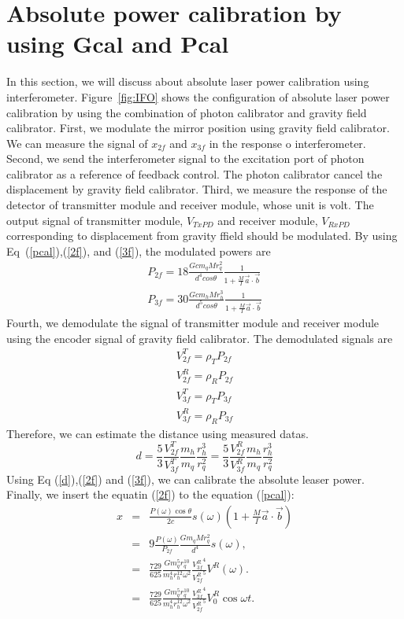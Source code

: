 \documentclass[A4]{spie}  %
\begin{document}
\section{Absolute power calibration by using Gcal and Pcal}
In this section, we will discuss about absolute laser power calibration using interferometer. 
Figure~\ref{fig:IFO} shows the configuration of absolute laser power calibration by using the combination of photon calibrator and gravity field calibrator.
First, we modulate the mirror position using gravity field calibrator. We can measure the signal of $x_{2f}$ and $x_{3f}$ in the response o interferometer. Second, we send the interferometer signal to the excitation port of photon calibrator as a reference of feedback control. The photon calibrator cancel the displacement by gravity field calibrator. Third, we measure the response of the detector of transmitter module and receiver module, whose unit is volt. The output signal of transmitter module, $V_{TxPD}$ and receiver module, $V_{RxPD}$ corresponding to displacement from gravity ffield should be modulated. By using Eq~(\ref{pcal}),(\ref{2f}), and (\ref{3f}), the modulated powers are
\begin{eqnarray}
 P_{2f}=18 \frac{Gcm_{q}Mr_{q}^2}{d^4cos\theta}\frac{1}{1+\frac{M}{I}\vec{a}\cdot \vec{b}} \label{2f} \\
 P_{3f}= 30\frac{Gcm_{h}Mr_{h}^3}{d^5cos\theta}\frac{1}{1+\frac{M}{I}\vec{a}\cdot \vec{b}} \label{3f}
\end{eqnarray}
Fourth, we demodulate the signal of transmitter module and receiver module using the encoder signal of gravity field calibrator.
The demodulated signals are 
\begin{eqnarray}
V_{2f}^{T}=\rho_{T}P_{2f} \\
V_{2f}^{R}=\rho_{R}P_{2f} \\
V_{3f}^{T}=\rho_{T}P_{3f} \\
V_{3f}^{R}=\rho_{R}P_{3f} 
\end{eqnarray} 
Therefore, we can estimate the distance using measured datas. 
\begin{equation}
d=\frac{5}{3} \frac{V_{2f}^T}{V_{3f}^T}\frac{m_{h}}{m_{q}}\frac{r_{h}^{3}}{r_{q}^{2}}=\frac{5}{3} \frac{V_{2f}^R}{V_{3f}^R}\frac{m_{h}}{m_{q}}\frac{r_{h}^{3}}{r_{q}^{2}} \label{d}
\end{equation}
Using Eq (\ref{d}),(\ref{2f}) and (\ref{3f}), we can calibrate the absolute leaser power.
Finally, we insert the equatin (\ref{2f}) to the equation (\ref{pcal}):
\begin{eqnarray}
x&=&\frac{P(\omega) \cos{\theta}}{2c} s(\omega)\left(1+\frac{M}{I}\vec{a} \cdot \vec{b} \right) \\
 &=&9\frac{P(\omega)}{P_{2f}}\frac{Gm_q M r_q^2}{d^4}s(\omega) , \\
 &=&\frac{729}{625} \frac{G m^5_q r_{q}^{10}}{m^4_h r_h^{12} \omega^2} \frac{{V_{3f}^{R}}^4}{{V_{2f}^{R}}^5}V^R(\omega) .\\
 &=&\frac{729}{625} \frac{G m^5_q r_{q}^{10}}{m^4_h r_h^{12} \omega^2} \frac{{V_{3f}^{R}}^4}{{V_{2f}^{R}}^5}V^R_0 \cos{\omega t} .\\ 
\end{eqnarray}
\end{document}
